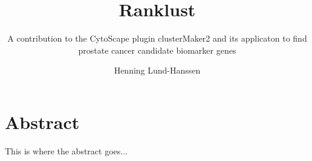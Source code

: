 \documentclass[UKenglish]{ifimaster}
\title{Ranklust}
\subtitle{A contribution to the CytoScape plugin clusterMaker2 and its
applicaton to find prostate cancer candidate biomarker genes}
\author{Henning Lund-Hanssen}
\begin{document}
\setlength{\parskip}{12pt}
\setlength{\parindent}{12pt}

\ififorside{}
\frontmatter{}
\maketitle{}

\chapter*{Abstract}
This is where the abstract goes...

\tableofcontents{}
\listoffigures{}
\listoftables{}

\mainmatter{}










\backmatter{}
\printbibliography
\end{document}
